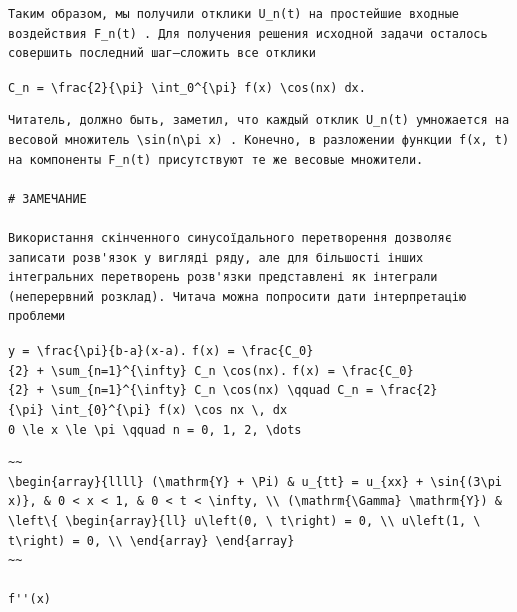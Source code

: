 \documentclass[
  ukrainian,
]{article}
\begin{document}
\begin{verbatim}
Таким образом, мы получили отклики U_n(t) на простейшие входные воздействия F_n(t) . Для получения решения исходной задачи осталось совершить последний шаг—сложить все отклики
\end{verbatim}

\texttt{C\_n\ =\ \textbackslash{}frac\{2\}\{\textbackslash{}pi\}\ \textbackslash{}int\_0\^{}\{\textbackslash{}pi\}\ f(x)\ \textbackslash{}cos(nx)\ dx.}

\begin{verbatim}
Читатель, должно быть, заметил, что каждый отклик U_n(t) умножается на весовой множитель \sin(n\pi x) . Конечно, в разложении функции f(x, t) на компоненты F_n(t) присутствуют те же весовые множители.

# ЗАМЕЧАНИЕ

Використання скінченного синусоїдального перетворення дозволяє записати розв'язок у вигляді ряду, але для більшості інших інтегральних перетворень розв'язки представлені як інтеграли (неперервний розклад). Читача можна попросити дати інтерпретацію проблеми
\end{verbatim}

\texttt{y\ =\ \textbackslash{}frac\{\textbackslash{}pi\}\{b-a\}(x-a).}
\texttt{f(x)\ =\ \textbackslash{}frac\{C\_0\}\{2\}\ +\ \textbackslash{}sum\_\{n=1\}\^{}\{\textbackslash{}infty\}\ C\_n\ \textbackslash{}cos(nx).}
\texttt{f(x)\ =\ \textbackslash{}frac\{C\_0\}\{2\}\ +\ \textbackslash{}sum\_\{n=1\}\^{}\{\textbackslash{}infty\}\ C\_n\ \textbackslash{}cos(nx)\ \textbackslash{}qquad\ C\_n\ =\ \textbackslash{}frac\{2\}\{\textbackslash{}pi\}\ \textbackslash{}int\_\{0\}\^{}\{\textbackslash{}pi\}\ f(x)\ \textbackslash{}cos\ nx\ \textbackslash{},\ dx}
\texttt{0\ \textbackslash{}le\ x\ \textbackslash{}le\ \textbackslash{}pi\ \textbackslash{}qquad\ n\ =\ 0,\ 1,\ 2,\ \textbackslash{}dots}

\begin{verbatim}
~~
\begin{array}{llll} (\mathrm{Y} + \Pi) & u_{tt} = u_{xx} + \sin{(3\pi x)}, & 0 < x < 1, & 0 < t < \infty, \\ (\mathrm{\Gamma} \mathrm{Y}) & \left\{ \begin{array}{ll} u\left(0, \ t\right) = 0, \\ u\left(1, \ t\right) = 0, \\ \end{array} \end{array}
~~

f''(x)
\end{verbatim}
\end{document}
